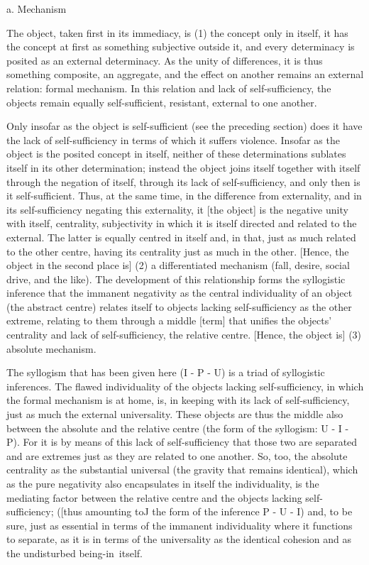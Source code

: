 a. Mechanism

The object, taken first in its immediacy, is
(1) the concept only in itself,
it has the concept at first as something subjective outside it, and
every determinacy is posited as an external determinacy.
As the unity of differences, it is thus something composite, an aggregate,
and the effect on another remains an external relation: formal mechanism.
In this relation and lack of self-sufficiency, the objects remain equally
self-sufficient, resistant, external to one another.

Only insofar as the object is self-sufficient (see the preceding section)
does it have the lack of self-sufficiency in terms of which it suffers violence.
Insofar as the object is the posited concept in itself,
neither of these determinations sublates itself
in its other determination;
instead the object joins itself together with itself
through the negation of itself, through its lack of self-sufficiency,
and only then is it self-sufficient.
Thus, at the same time, in the difference from externality,
and in its self-sufficiency negating this externality,
it [the object] is the negative unity with itself, centrality,
subjectivity in which it is itself directed and related to the external.
The latter is equally centred in itself and, in that, just as much related
to the other centre, having its centrality just as much in the other.
[Hence, the object in the second place is]
(2) a differentiated mechanism (fall, desire, social drive, and the like).
The development of this relationship forms the syllogistic inference
that the immanent negativity as the central individuality of an object
(the abstract centre) relates itself to objects lacking self-sufficiency as
the other extreme, relating to them through a middle [term] that
unifies the objects' centrality and lack of self-sufficiency,
the relative centre. [Hence, the object is]
(3) absolute mechanism.

The syllogism that has been given here (I - P - U) is
a triad of syllogistic inferences.
The flawed individuality of the objects lacking self-sufficiency,
in which the formal mechanism is at home, is, in keeping with
its lack of self-sufficiency, just as much the external universality.
These objects are thus the middle also between the absolute and
the relative centre (the form of the syllogism: U - I - P).
For it is by means of this lack of self-sufficiency
that those two are separated and are extremes
just as they are related to one another.
So, too, the absolute centrality as the substantial universal
(the gravity that remains identical),
which as the pure negativity also encapsulates in itself the individuality,
is the mediating factor between the relative centre
and the objects lacking self-sufficiency;
([thus amounting toJ the form of the inference P - U - I)
and, to be sure, just as essential in terms of the immanent individuality
where it functions to separate, as it is in terms of the universality
as the identical cohesion and as the undisturbed being-in~itself.


